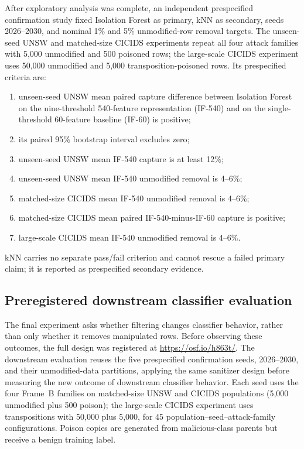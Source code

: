\documentclass[conference]{IEEEtran}
\begin{document}
After exploratory analysis was complete, an independent prespecified
confirmation study fixed Isolation Forest as primary, kNN as secondary, seeds
2026--2030, and nominal 1\% and 5\% unmodified-row removal targets. The
unseen-seed UNSW and matched-size CICIDS experiments repeat all four attack
families with 5,000 unmodified and 500 poisoned rows; the large-scale CICIDS
experiment uses 50,000 unmodified and 5,000 transposition-poisoned rows. Its
prespecified criteria are:
\begin{enumerate}
\item[(P1)] unseen-seed UNSW mean paired capture difference between Isolation
Forest on the nine-threshold 540-feature representation (IF-540) and on the
single-threshold 60-feature baseline (IF-60) is positive;
\item[(P2)] its paired 95\% bootstrap interval excludes zero;
\item[(P3)] unseen-seed UNSW mean IF-540 capture is at least 12\%;
\item[(P4)] unseen-seed UNSW mean IF-540 unmodified removal is 4--6\%;
\item[(T1)] matched-size CICIDS mean IF-540 unmodified removal is 4--6\%;
\item[(T2)] matched-size CICIDS mean paired IF-540-minus-IF-60 capture is positive;
\item[(T3)] large-scale CICIDS mean IF-540 unmodified removal is 4--6\%.
\end{enumerate}
kNN carries no separate pass/fail criterion and cannot rescue a failed primary
claim; it is reported as prespecified secondary evidence.

\subsection{Preregistered downstream classifier evaluation}
The final experiment asks whether filtering changes classifier behavior, rather
than only whether it removes manipulated rows. Before observing these outcomes,
the full design was registered at \url{https://osf.io/h863t/}.
The downstream evaluation reuses the five prespecified confirmation seeds,
2026--2030, and their unmodified-data partitions, applying the same sanitizer
design before measuring the new outcome of downstream classifier behavior.
Each seed uses the four Frame~B families on matched-size UNSW and CICIDS populations
(5,000 unmodified plus 500 poison); the large-scale CICIDS experiment uses transpositions with
50,000 plus 5,000, for 45 population--seed--attack-family configurations. Poison copies are
generated from malicious-class parents but receive a benign training label.
\end{document}
